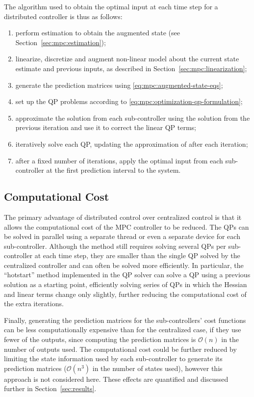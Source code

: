 The algorithm used to obtain the optimal input at each time step for a distributed controller is thus as follows:

\begin{enumerate}
  \item perform estimation to obtain the augmented state (see Section~\ref{sec:mpc:estimation});
  \item linearize, discretize and augment non-linear model about the current state estimate and previous inputs, as described in Section~\ref{sec:mpc:linearization};
  \item generate the prediction matrices using \eqref{eq:mpc:augmented-state-eqs};
  \item set up the QP problems according to \eqref{eq:mpc:optimization-qp-formulation};
  \item approximate the solution from each sub-controller using the solution from the previous iteration and use it to correct the linear QP terms;
  \item iteratively solve each QP, updating the approximation of   after each iteration;
  \item after a fixed number of iterations, apply the optimal input from each sub-controller at the first prediction interval to the system.
\end{enumerate}

\subsection{Computational Cost}

The primary advantage of distributed control over centralized control is that it allows the computational cost of the MPC controller to be reduced.
The QPs can be solved in parallel using a separate thread or even a separate device for each sub-controller.
Although the method still requires solving several QPs per sub-controller at each time step, they are smaller than the single QP solved by the centralized controller and can often be solved more efficiently.
In particular, the ``hotstart'' method implemented in the \qpoases{} QP solver can solve a QP using a previous solution as a starting point, efficiently solving series of QPs in which the Hessian and linear terms change only slightly, further reducing the computational cost of the extra iterations.

Finally, generating the prediction matrices for the sub-controllers' cost functions can be less computationally expensive than for the centralized case, if they use fewer of the outputs, since computing the prediction matrices is $\mathcal{O}(n)$ in the number of outputs used.
The computational cost could be further reduced by limiting the state information used by each sub-controller to generate its prediction matrices ($\mathcal{O}(n^3)$ in the number of states used), however this approach is not considered here.
These effects are quantified and discussed further in Section~\ref{sec:results}.

